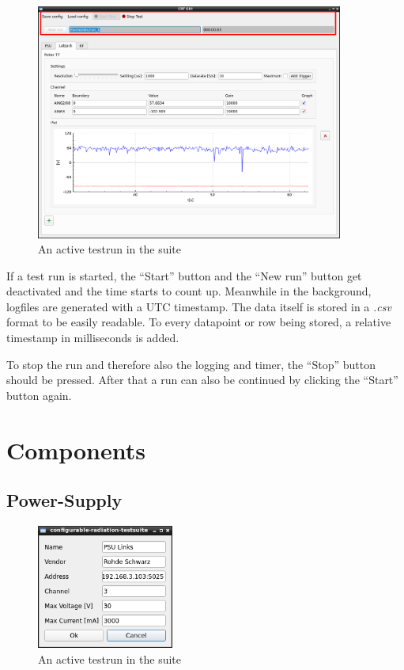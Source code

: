 \documentclass[10pt,a4paper]{article}
\begin{document}
	\begin{figure}[H]
	\centering
	\includegraphics[width=0.9\textwidth]{./4_Testrun.png}
	\caption{An active testrun in the suite}
	\end{figure}
	
	If a test run is started, the \enquote{Start} button and the \enquote{New run} button get deactivated and the time starts to count up. Meanwhile in the background, logfiles are generated with a UTC timestamp. The data itself is stored in a \textit{.csv} format to be easily readable. To every datapoint or row being stored, a relative timestamp in milliseconds is added.
	
	\bigbreak
	
	To stop the run and therefore also the logging and timer, the \enquote{Stop} button should be pressed. After that a run can also be continued by clicking the \enquote{Start} button again.	
	
\section{Components}

	\subsection{Power-Supply}
	
	\begin{figure}[H]
	\centering
	\includegraphics[width=0.4\textwidth]{./2_PSU_menu.png}
	\caption{An active testrun in the suite}
	\label{f:psu_menu}
	\end{figure}
	
\end{document}
